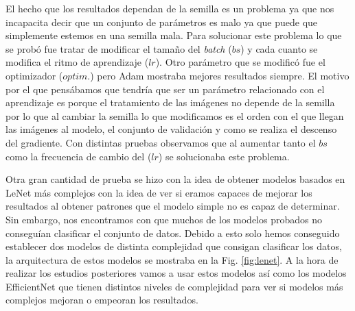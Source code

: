 \documentclass[a4paper,12pt,twoside,titlepage]{article}
\begin{document}
El hecho que los resultados dependan de la semilla es un problema ya que nos incapacita decir que un conjunto de parámetros es malo ya que puede que simplemente estemos en una semilla mala. Para solucionar este problema lo que se probó fue tratar de modificar el tamaño del \textit{batch} ($bs$) y cada cuanto se modifica el ritmo de aprendizaje ($lr$). Otro parámetro que se modificó fue el optimizador ($optim.$) pero Adam mostraba mejores resultados siempre. El motivo por el que pensábamos que tendría que ser un parámetro relacionado con el aprendizaje es porque el tratamiento de las imágenes no depende de la semilla por lo que al cambiar la semilla lo que modificamos es el orden con el que llegan las imágenes al modelo, el conjunto de validación y como se realiza el descenso del gradiente. Con distintas pruebas observamos que al aumentar tanto el $bs$ como la frecuencia de cambio del ($lr$) se solucionaba este problema.

Otra gran cantidad de prueba se hizo con la idea de obtener modelos basados en LeNet más complejos con la idea de ver si eramos capaces de mejorar los resultados al obtener patrones que el modelo simple no es capaz de determinar. Sin embargo, nos encontramos con que muchos de los modelos probados no conseguían clasificar el conjunto de datos. Debido a esto solo hemos conseguido establecer dos modelos de distinta complejidad que consigan clasificar los datos, la arquitectura de estos modelos se mostraba en la Fig. \ref{fig:lenet}. A la hora de realizar los estudios posteriores vamos a usar estos modelos así como los modelos EfficientNet que tienen distintos niveles de complejidad para ver si modelos más complejos mejoran o empeoran los resultados.
\end{document}
